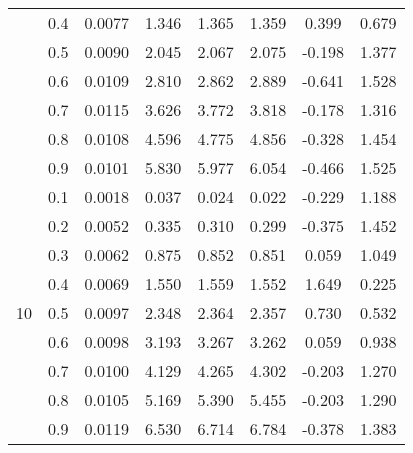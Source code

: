 \documentclass[11pt,a4paper]{report}
\begin{document}
\begin{longtable}{ | c | c || c | c | c | c | c | c | }
 & 0.4 & 0.0077 & 1.346 & 1.365 & 1.359 & 0.399 & 0.679 \\
 & 0.5 & 0.0090 & 2.045 & 2.067 & 2.075 & -0.198 & 1.377 \\
 & 0.6 & 0.0109 & 2.810 & 2.862 & 2.889 & -0.641 & 1.528 \\
 & 0.7 & 0.0115 & 3.626 & 3.772 & 3.818 & -0.178 & 1.316 \\
 & 0.8 & 0.0108 & 4.596 & 4.775 & 4.856 & -0.328 & 1.454 \\
 & 0.9 & 0.0101 & 5.830 & 5.977 & 6.054 & -0.466 & 1.525 \\
 \hline
\multirow{9}{*}{10} & 0.1 & 0.0018 & 0.037 & 0.024 & 0.022 & -0.229 & 1.188 \\
 & 0.2 & 0.0052 & 0.335 & 0.310 & 0.299 & -0.375 & 1.452 \\
 & 0.3 & 0.0062 & 0.875 & 0.852 & 0.851 & 0.059 & 1.049 \\
 & 0.4 & 0.0069 & 1.550 & 1.559 & 1.552 & 1.649 & 0.225 \\
 & 0.5 & 0.0097 & 2.348 & 2.364 & 2.357 & 0.730 & 0.532 \\
 & 0.6 & 0.0098 & 3.193 & 3.267 & 3.262 & 0.059 & 0.938 \\
 & 0.7 & 0.0100 & 4.129 & 4.265 & 4.302 & -0.203 & 1.270 \\
 & 0.8 & 0.0105 & 5.169 & 5.390 & 5.455 & -0.203 & 1.290 \\
 & 0.9 & 0.0119 & 6.530 & 6.714 & 6.784 & -0.378 & 1.383 \\
 \hline
\hline
\end{longtable}
\end{document}
